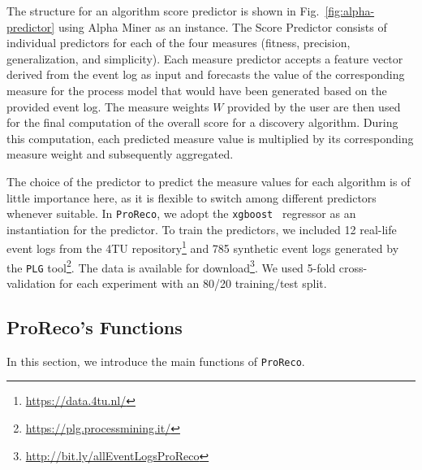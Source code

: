 The structure for an algorithm score predictor is shown in Fig.~\ref{fig:alpha-predictor} using Alpha Miner as an instance. 
The Score Predictor consists of individual predictors for each of the four measures (fitness, precision, generalization, and simplicity). 
Each measure predictor accepts a feature vector derived from the event log as input and forecasts the value of the corresponding measure for the process model that would have been generated based on the provided event log. 
The measure weights $W$ provided by the user are then used for the final computation of the overall score for a discovery algorithm. 
During this computation, each predicted measure value is multiplied by its corresponding measure weight and subsequently aggregated. 


The choice of the predictor to predict the measure values for each algorithm is of little importance here, as it is flexible to switch among different predictors whenever suitable. 
In \texttt{ProReco}, we adopt the \texttt{xgboost}~\cite{ChenG16XGBoost} regressor as an instantiation for the predictor. 
To train the predictors, we included 12 real-life event logs from the 4TU repository\footnote{\url{https://data.4tu.nl/}} and 785 synthetic event logs generated by the \texttt{PLG} tool\footnote{\url{https://plg.processmining.it/}}. 
The data is available for download\footnote{\url{http://bit.ly/allEventLogsProReco}}. 
We used 5-fold cross-validation for each experiment with an 80/20 training/test split.

\subsection{ProReco's Functions}\label{subsec:ProReco-functions}
In this section, we introduce the main functions of \texttt{ProReco}. 

